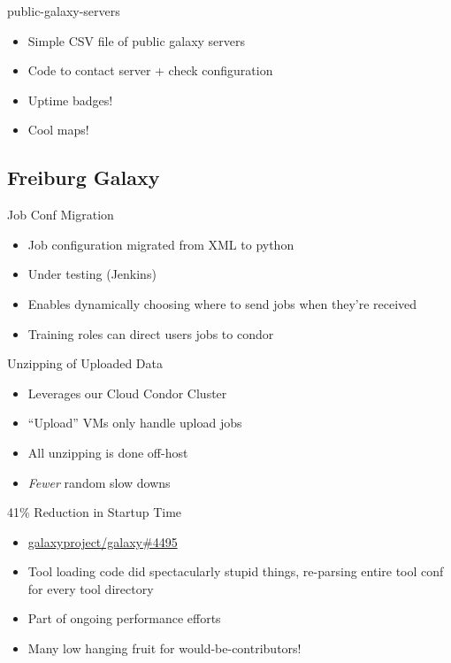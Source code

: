 \documentclass[12pt]{ufrslides}
\begin{document}
	\begin{frame}{public-galaxy-servers}
		\begin{itemize}
			\item Simple CSV file of public galaxy servers
			\item Code to contact server + check configuration
			\item Uptime badges! %
			\item Cool maps!
		\end{itemize}
	\end{frame}

\subsection{Freiburg Galaxy}
	\begin{frame}{Job Conf Migration}
		\begin{itemize}
			\item Job configuration migrated from XML to python
			\item Under testing (Jenkins)
			\item Enables dynamically choosing where to send jobs when they're received
			\item Training roles can direct users jobs to condor
		\end{itemize}
	\end{frame}

	\begin{frame}{Unzipping of Uploaded Data}
		\begin{itemize}
			\item Leverages our Cloud Condor Cluster
			\item ``Upload'' VMs only handle upload jobs
			\item All unzipping is done off-host
			\item \emph{Fewer} random slow downs
		\end{itemize}
	\end{frame}

	\begin{frame}{41\% Reduction in Startup Time}
		\begin{itemize}
			\item \href{https://github.com/galaxyproject/galaxy/pull/4495}{galaxyproject/galaxy\#4495}
			\item Tool loading code did spectacularly stupid things, re-parsing entire tool conf for every tool directory
			\item Part of ongoing performance efforts
			\item Many low hanging fruit for would-be-contributors!
		\end{itemize}
	\end{frame}
\end{document}
